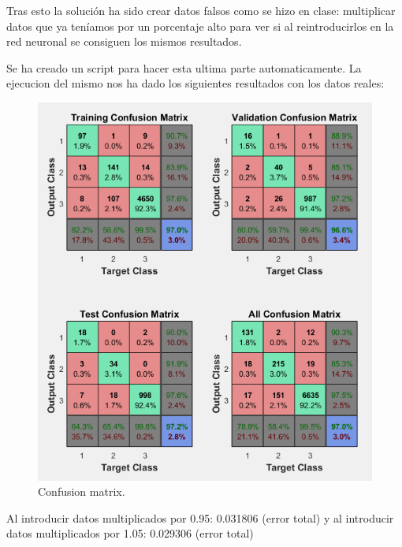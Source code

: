 \documentclass[a4paper,12pt,titlepage]{article}
\begin{document}
Tras esto la solución ha sido crear datos falsos como se hizo en clase: multiplicar datos que ya teníamos por un porcentaje alto para ver si al reintroducirlos en la red neuronal se consiguen los mismos resultados.

Se ha creado un script para hacer esta ultima parte automaticamente. La ejecucion del mismo nos ha dado los siguientes resultados con los datos reales:

\begin{figure}[!ht]
	\centering
	\label{fig:ConfMatrix}
	\includegraphics[width=\textwidth]{ConfMatrix.png}
	\caption{Confusion matrix.}
\end{figure}

Al introducir datos multiplicados por 0.95: 0.031806 (error total) y al introducir datos multiplicados por 1.05: 0.029306 (error total)



\newpage
\newpage


\end{document}
